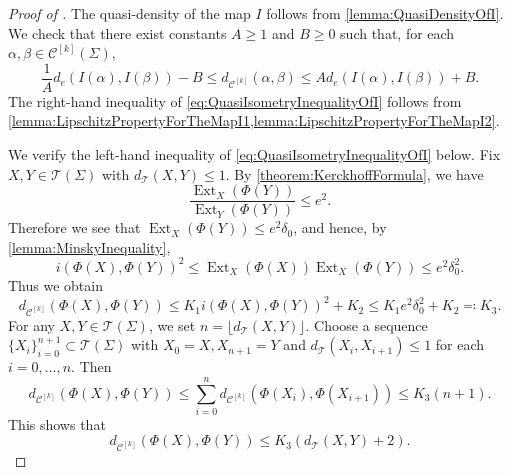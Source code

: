 \documentclass[a4paper,11pt]{amsart}
\numberwithin{equation}{section}
\theoremstyle{definition}
\newcommand{\Teich}{\mathcal{T}}
\DeclareMathOperator{\Ext}{Ext}
\newcommand{\multicurve}[1]{\mathcal{C}^{[#1]}}
\begin{document}
\begin{proof}[Proof of ]
    The quasi-density of the map $I$ follows from \cref{lemma:QuasiDensityOfI}.
    We check that there exist constants $A\geq 1$ and $B\geq 0$ such that, for each $\alpha,\beta\in\multicurve{k}(\Sigma)$, 
    \begin{equation}\label{eq:QuasiIsometryInequalityOfI}
        \frac1A d_e(I(\alpha),I(\beta)) -B \leq d_{\multicurve{k}}(\alpha,\beta)\leq A d_e(I(\alpha),I(\beta)) +B.
    \end{equation}
    The right-hand inequality of \cref{eq:QuasiIsometryInequalityOfI} follows from \cref{lemma:LipschitzPropertyForTheMapI1,lemma:LipschitzPropertyForTheMapI2}.

    We verify the left-hand inequality of \cref{eq:QuasiIsometryInequalityOfI} below.
    Fix $X,Y\in \Teich(\Sigma)$ with $d_{\Teich}(X,Y)\leq 1$.
    By \cref{theorem:KerckhoffFormula}, we have 
    \begin{equation*}
        \frac{\Ext_X(\Phi(Y))}{\Ext_Y(\Phi(Y))}\leq e^2.
    \end{equation*}
    Therefore we see that $\Ext_X(\Phi(Y))\leq e^2\delta_0$, and hence, by \cref{lemma:MinskyInequality},
    \begin{equation*}
        i(\Phi(X),\Phi(Y))^2\leq \Ext_X(\Phi(X))\Ext_X(\Phi(Y))\leq e^2\delta_0^2.
    \end{equation*}
    Thus we obtain 
    \begin{equation*}
        d_{\multicurve{k}}(\Phi(X),\Phi(Y))\leq K_1i(\Phi(X),\Phi(Y))^2+K_2\leq K_1e^2\delta_0^2+K_2\eqqcolon K_3.
    \end{equation*}
    For any $X,Y\in \Teich(\Sigma)$, we set $n=\lfloor d_{\Teich}(X,Y)\rfloor$.
    Choose a sequence $\{X_i\}_{i=0}^{n+1}\subset \Teich(\Sigma)$ with $X_0=X, X_{n+1}=Y$ and $d_{\Teich}(X_i,X_{i+1})\leq 1$ for each $i=0,\ldots,n$.
    Then 
    \begin{equation*}
        d_{\multicurve{k}}(\Phi(X),\Phi(Y))\leq \sum_{i=0}^n d_{\multicurve{k}}(\Phi(X_i),\Phi(X_{i+1}))\leq K_3 (n+1).
    \end{equation*}
    This shows that
    \begin{equation}\label{eq:BoundOnGraphDistanceByTeichmullerDistance}
        d_{\multicurve{k}}(\Phi(X),\Phi(Y))\leq K_3 (d_{\Teich}(X,Y)+2).
    \end{equation}


\end{proof}
\end{document}
